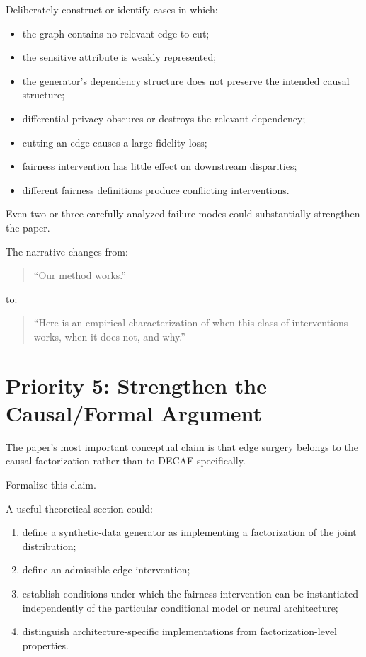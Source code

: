 \documentclass[11pt]{article}
\begin{document}
Deliberately construct or identify cases in which:

\begin{itemize}
    \item the graph contains no relevant edge to cut;
    \item the sensitive attribute is weakly represented;
    \item the generator's dependency structure does not preserve the intended causal structure;
    \item differential privacy obscures or destroys the relevant dependency;
    \item cutting an edge causes a large fidelity loss;
    \item fairness intervention has little effect on downstream disparities;
    \item different fairness definitions produce conflicting interventions.
\end{itemize}

Even two or three carefully analyzed failure modes could substantially strengthen the paper.

The narrative changes from:

\begin{quote}
``Our method works.''
\end{quote}

to:

\begin{quote}
``Here is an empirical characterization of when this class of interventions works, when it does not, and why.''
\end{quote}

\section*{Priority 5: Strengthen the Causal/Formal Argument}

The paper's most important conceptual claim is that edge surgery belongs to the causal factorization rather than to DECAF specifically.

Formalize this claim.

A useful theoretical section could:

\begin{enumerate}
    \item define a synthetic-data generator as implementing a factorization of the joint distribution;
    \item define an admissible edge intervention;
    \item establish conditions under which the fairness intervention can be instantiated independently of the particular conditional model or neural architecture;
    \item distinguish architecture-specific implementations from factorization-level properties.
\end{enumerate}
\end{document}
